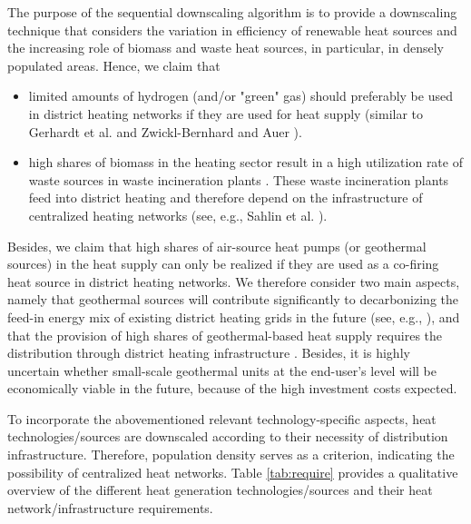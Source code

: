The purpose of the sequential downscaling algorithm is to provide a downscaling technique that considers the variation in efficiency of renewable heat sources and the increasing role of biomass and waste heat sources, in particular, in densely populated areas. Hence, we claim that 

\begin{itemize}
	\item limited amounts of hydrogen (and/or "green" gas) should preferably be used in district heating networks if they are used for heat supply (similar to Gerhardt et al.  \cite{gerhardt2020hydrogen} and Zwickl-Bernhard and Auer \cite{zwickl2021demystifying}).
	\item high shares of biomass in the heating sector result in a high utilization rate of waste sources in waste incineration plants \cite{fruergaard2010energy}. These waste incineration plants feed into district heating and therefore depend on the infrastructure of centralized heating networks (see, e.g., Sahlin et al. \cite{sahlin2004effects}).
\end{itemize}

Besides, we claim that high shares of air-source heat pumps (or geothermal sources) in the heat supply can only be realized if they are used as a co-firing heat source in district heating networks. We therefore consider two main aspects, namely that geothermal sources will contribute significantly to decarbonizing the feed-in energy mix of existing district heating grids in the future (see, e.g., \cite{weinand2019developing}), and that the provision of high shares of geothermal-based heat supply requires the distribution through district heating infrastructure \cite{dalla2020scenarios}. Besides, it is highly uncertain whether small-scale geothermal units at the end-user's level will be economically viable in the future, because of the high investment costs expected.\vspace{0.3cm}

To incorporate the abovementioned relevant technology-specific aspects, heat technologies/sources are downscaled according to their necessity of distribution infrastructure. Therefore, population density serves as a criterion, indicating the possibility of centralized heat networks. Table \ref{tab:require} provides a qualitative overview of the different heat generation technologies/sources and their heat network/infrastructure requirements.\vspace{0.3cm}

